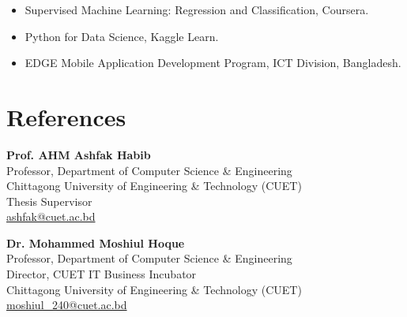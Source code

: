 \documentclass[a4paper,11pt]{article}
\begin{document}
\begin{itemize}
    \item Supervised Machine Learning: Regression and Classification,
    Coursera.
    \item Python for Data Science, Kaggle Learn.
    \item EDGE Mobile Application Development Program, ICT Division,
    Bangladesh.
\end{itemize}

\section*{References}

\textbf{Prof. AHM Ashfak Habib}\\
Professor, Department of Computer Science \& Engineering\\
Chittagong University of Engineering \& Technology (CUET)\\
Thesis Supervisor\\
\href{mailto:ashfak@cuet.ac.bd}{ashfak@cuet.ac.bd}

\vspace{0.5em}

\textbf{Dr. Mohammed Moshiul Hoque}\\
Professor, Department of Computer Science \& Engineering\\
Director, CUET IT Business Incubator\\
Chittagong University of Engineering \& Technology (CUET)\\
\href{mailto:moshiul_240@cuet.ac.bd}{moshiul\_240@cuet.ac.bd}
\end{document}
